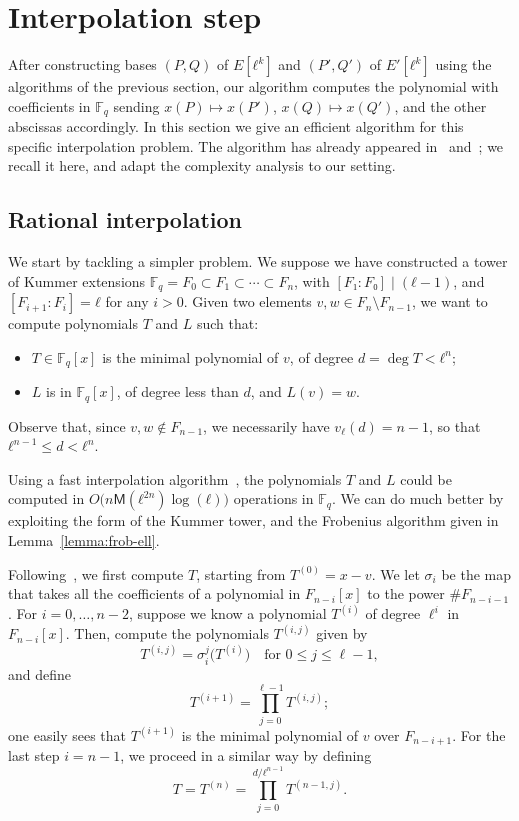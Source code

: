 \documentclass{lms}
\def\cout#1{\mathsf{#1}}
\newcommand{\F}{\mathbb{F}}
\newcommand{\MM}{\cout{M}}
\begin{document}



\section{Interpolation step}
\label{sec:interpolation}

After constructing bases $(P,Q)$ of $E[ℓ^k]$ and $(P',Q')$ of
$E'[ℓ^k]$ using the algorithms of the previous section, our algorithm
computes the polynomial with coefficients in $\F_q$ sending
$x(P)↦x(P')$, $x(Q)↦x(Q')$, and the other abscissas accordingly.  In
this section we give an efficient algorithm for this specific
interpolation problem. The algorithm has already appeared
in~\cite{df10} and~\cite{enge+morain03}; we recall it here, and adapt
the complexity analysis to our setting.

\subsection{Rational interpolation}

We start by tackling a simpler problem. We suppose we have constructed
a tower of Kummer extensions $\F_q=F_0⊂F_1⊂\cdots⊂F_n$, with
$[F₁:F₀]\mid(ℓ-1)$, and $[F_{i+1}:F_i]=ℓ$ for any $i>0$. Given two
elements $v,w∈F_n\setminus F_{n-1}$, we want to compute polynomials
$T$ and $L$ such that:
\begin{itemize}
\item $T \in \F_q[x]$ is the minimal polynomial of $v$, of degree
  $d=\deg T<ℓ^n$;
\item $L$ is in $\F_q[x]$, of degree less than $d$, and $L(v)=w$.
\end{itemize}
Observe that, since $v,w∉F_{n-1}$, we necessarily have $v_ℓ(d)=n-1$,
so that $ℓ^{n-1}≤d<ℓ^n$.

Using a fast interpolation algorithm~\cite[Chapter~10.2]{vzGG}, the
polynomials $T$ and $L$ could be computed in
$O\bigl(n\MM(ℓ^{2n})\log(ℓ)\bigr)$ operations in $\F_q$. We can do
much better by exploiting the form of the Kummer tower, and the
Frobenius algorithm given in Lemma~\ref{lemma:frob-ell}.

Following~\cite{df10}, we first compute $T$, starting from
$T^{(0)}=x-v$.  We let $\sigma_i$ be the map that takes all the
coefficients of a polynomial in $F_{n-i}[x]$ to the power
$\#F_{n-i-1}$. For $i=0,\dots,n-2$, suppose we know a polynomial
$T^{(i)}$ of degree $\ell^i$ in $F_{n-i}[x]$. Then, compute the
polynomials $T^{(i,j)}$ given by
\begin{equation*}
  T^{(i,j)}= \sigma_i^j\bigl (T^{(i)} \bigr)
  \quad\text{for $0 \le j \le \ell-1$},
\end{equation*}
and define
$$T^{(i+1)}=\prod_{j=0}^{\ell-1} T^{(i,j)};$$ one easily sees that
$T^{(i+1)}$ is the minimal polynomial of $v$ over $F_{n-i+1}$. For the
last step $i=n-1$, we proceed in a similar way by defining
\begin{equation*}
  T = T^{(n)}=\prod_{j=0}^{d/ℓ^{n-1}} T^{(n-1,j)}.
\end{equation*}
\end{document}
